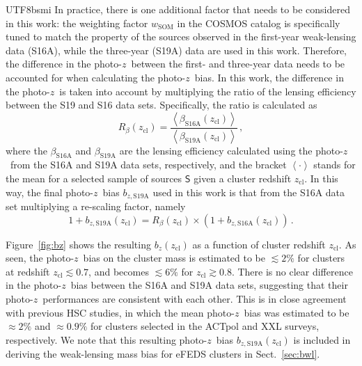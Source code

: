 \documentclass[longauth]{aa}
\newcommand{\redshift}{\ensuremath{z}}
\newcommand{\zcl}{\ensuremath{z_{\mathrm{cl}}}}
\newcommand{\bz}{\ensuremath{b_{z}}}
\newcommand{\percent}{\ensuremath{\%}}
\begin{document}
\begin{CJK*}{UTF8}{bsmi}
In practice, there is one additional factor that needs to be considered in this work:
the weighting factor $w_{\mathrm{SOM}}$ in the COSMOS catalog is specifically tuned to match the property of the sources observed in the first-year weak-lensing data (S16A), while the three-year (S19A) data are used in this work.
Therefore, the difference in the photo-\redshift\ between the first- and three-year data needs to be accounted for when calculating the photo-\redshift\ bias.
In this work, the difference in the photo-\redshift\ is taken into account by multiplying the ratio of the lensing efficiency between the S19 and S16 data sets.
Specifically, the ratio is calculated as
\[
R_{\beta}(\zcl) = \frac{
\left\langle\beta_{\mathrm{S16A}}(\zcl)\right\rangle
}{
\left\langle\beta_{\mathrm{S19A}}(\zcl)\right\rangle
} \, ,
\] 
where the $\beta_{\mathrm{S16A}}$ and $\beta_{\mathrm{S19A}}$ are the lensing efficiency calculated using the photo-\redshift\ from the S16A and S19A data sets, respectively, and the bracket $\left\langle\cdot\right\rangle$ stands for the mean for a selected sample of sources $\mathsf{S}$ given a cluster redshift \zcl.
In this way, the final photo-\redshift\ bias $b_{z,\mathrm{S19A}}$ used in this work is that from the S16A data set multiplying a re-scaling factor, namely
%
\begin{equation}
\label{eq:rescale_photoz}
1 + b_{z,\mathrm{S19A}}(\zcl) = R_{\beta}(\zcl) \times \left( 1 + b_{z,\mathrm{S16A}}(\zcl) \right) \, .
\end{equation}
% 



Figure~\ref{fig:bz} shows the resulting $\bz(\zcl)$ as a function of cluster redshift \zcl.
As seen, the photo-\redshift\ bias on the cluster mass is estimated to be $\lesssim2\percent$ for clusters at redshift $\zcl\lesssim0.7$, and becomes $\lesssim6\percent$ for $\zcl\gtrsim0.8$.
There is no clear difference in the photo-\redshift\ bias between the S16A and S19A data sets, suggesting that their photo-\redshift\ performances are consistent with each other.
This is in close agreement with previous HSC studies, in which the mean photo-\redshift\ bias was estimated to be $\approx2\percent$ and $\approx0.9\percent$ for clusters selected in the ACTpol  \citep{miyazaki18} and XXL \citep{umetsu20} surveys, respectively.
We note that this resulting photo-\redshift\ bias $b_{z,\mathrm{S19A}}(\zcl)$ is included in deriving the weak-lensing mass bias for eFEDS clusters in Sect.~\ref{sec:bwl}.





\end{CJK*}
\end{document}
